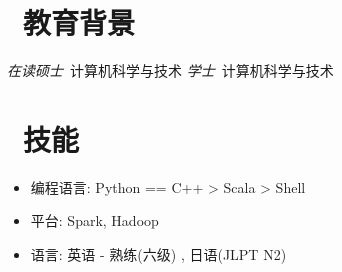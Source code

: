\documentclass[13pt,a4paper]{resume}
\begin{document}


 
\section{\faGraduationCap\  教育背景}
\textit{在读硕士}\ 计算机科学与技术
\textit{学士}\ 计算机科学与技术



\section{\faCogs\ 技能}
\begin{itemize}[parsep=0.5ex]
  \item 编程语言: Python == C++ > Scala > Shell
  \item 平台: Spark, Hadoop
  \item 语言: 英语 - 熟练(六级) , 日语(JLPT N2)

\end{itemize}
\end{document}
